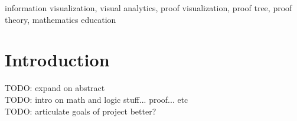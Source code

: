 \documentclass[conference]{IEEEtran}
\begin{document}
\newcommand{\sentencefive}{The proof visualization tool allows either open exploration of a proof or a directed walk-through, revealing supplementary information to serve as a form of discourse as the nodes are visited.}


\newcommand{\sentencesix}{This work provides a tool for gaining understanding of the structure of proofs, insight into the processes used in constructing such proofs, and also serves as a starting point for visualizations of proof trees in more complicated logics.}




\begin{abstract}
    \sentenceone{} \sentencetwo{} \sentencethree{} \sentencefour{} \sentencefive{} \sentencesix{}
\end{abstract}


\begin{IEEEkeywords}
    information visualization, visual analytics, proof visualization, proof tree, proof theory, mathematics education
\end{IEEEkeywords}


\section{Introduction}


TODO: expand on abstract \\

TODO: intro on math and logic stuff... proof... etc \\

TODO: articulate goals of project better? \\
\end{document}
